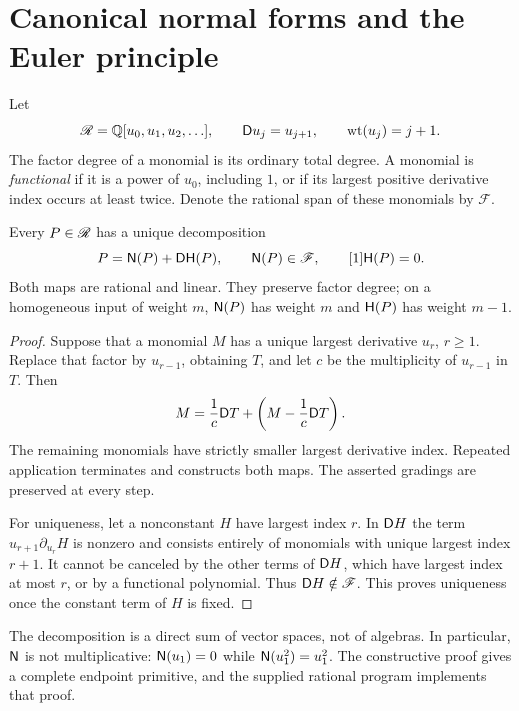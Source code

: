 \section{Canonical normal forms and the Euler principle}
\label{sec:normal}

Let
\[
 \mathscr R=\mathbb Q[u_0,u_1,u_2,\ldots],\qquad
 \mathsf D u_j=u_{j+1},\qquad \operatorname{wt}(u_j)=j+1.
\]
The factor degree of a monomial is its ordinary total degree.
A monomial is \emph{functional} if it is a power of $u_0$, including $1$,
or if its largest positive derivative index occurs at least twice.
Denote the rational span of these monomials by $\mathscr F$.

\begin{proposition}\label{prop:normal}
Every $P\in\mathscr R$ has a unique decomposition
\begin{equation}\label{eq:decomp}
 P=\mathsf N(P)+\mathsf D\mathsf H(P),\qquad
 \mathsf N(P)\in\mathscr F,\qquad [1]\mathsf H(P)=0.
\end{equation}
Both maps are rational and linear. They preserve factor degree; on a
homogeneous input of weight $m$, $\mathsf N(P)$ has weight $m$ and $\mathsf H(P)$
has weight $m-1$.
\end{proposition}
\begin{proof}
Suppose that a monomial $M$ has a unique largest derivative $u_r$,
$r\ge1$. Replace that factor by $u_{r-1}$, obtaining $T$, and let $c$
be the multiplicity of $u_{r-1}$ in $T$. Then
\[
 M=\frac1c\mathsf D T+\left(M-\frac1c\mathsf D T\right).
\]
The remaining monomials have strictly smaller largest derivative index.
Repeated application terminates and constructs both maps. The asserted
gradings are preserved at every step.

For uniqueness, let a nonconstant $H$ have largest index $r$. In $\mathsf D H$
the term $u_{r+1}\partial_{u_r}H$ is nonzero and consists entirely of
monomials with unique largest index $r+1$. It cannot be canceled by the
other terms of $\mathsf D H$, which have largest index at most $r$, or by a
functional polynomial. Thus $\mathsf D H\notin\mathscr F$. This proves
uniqueness once the constant term of $H$ is fixed.
\end{proof}

The decomposition is a direct sum of vector spaces, not of algebras.
In particular, $\mathsf N$ is not multiplicative: $\mathsf N(u_1)=0$ while
$\mathsf N(u_1^2)=u_1^2$. The constructive proof gives a complete endpoint
primitive, and the supplied rational program implements that proof.

